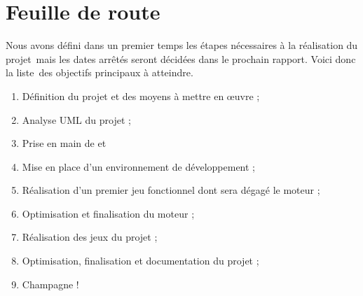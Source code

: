 \documentclass[a4paper]{article}
\begin{document}
\clearpage

\part{Feuille de route}

Nous avons défini dans un premier temps les étapes nécessaires à la réalisation du projet\
mais les dates arrêtés seront décidées dans le prochain rapport. Voici donc la liste\
des objectifs principaux à atteindre.

\begin{enumerate}
\item{Définition du projet et des moyens à mettre en \oe uvre ;}
\item{Analyse UML du projet ;}
\item{Prise en main de \bsc{Qt} et \bsc{C++}}
\item{Mise en place d'un environnement de développement ;}
\item{Réalisation d'un premier jeu fonctionnel dont sera dégagé le moteur ;}
\item{Optimisation et finalisation du moteur ;}
\item{Réalisation des jeux du projet ;}
\item{Optimisation, finalisation et documentation du projet ;}
\item{Champagne !}
\end{enumerate}
\end{document}
